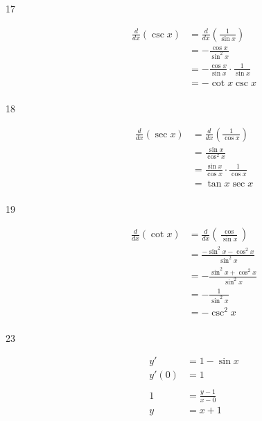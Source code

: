 \documentclass[letterpaper]{exam}
\begin{document}
\begin{description}
    \item[17] 
      \begin{align*}
          \frac{d}{dx} (\csc x) & = \frac{d}{dx} \left( \frac{1}{\sin x} \right) \\
                                & = - \frac{\cos x}{\sin^2 x} \\
                                & = - \frac{\cos x}{\sin x} \cdot \frac{1}{\sin x} \\
                                & = - \cot x \csc x \\
      \end{align*}

    \item[18] 
      \begin{align*}
          \frac{d}{dx} (\sec x) & = \frac{d}{dx} \left( \frac{1}{\cos x} \right) \\
                                & = \frac{\sin x}{\cos^2 x} \\
                                & = \frac{\sin x}{\cos x} \cdot \frac{1}{\cos x} \\
                                & = \tan x \sec x \\
      \end{align*}

    \item[19] 
      \begin{align*}
          \frac{d}{dx} (\cot x) & = \frac{d}{dx} \left( \frac{\cos}{\sin x} \right) \\
                                & = \frac{- \sin^2 x - \cos^2 x}{\sin^2 x} \\
                                & = - \frac{\sin^2 x + \cos^2 x}{\sin^2 x} \\
                                & = - \frac{1}{\sin^2 x} \\
                                & = - \csc^2 x \\
      \end{align*}

    \item[23] 
      \begin{align*}
        y'    & = 1 - \sin x \\
        y'(0) & = 1 \\
        \\
        1     & = \frac{y - 1}{x - 0} \\
        y     & = x + 1 \\
      \end{align*}


\end{description}
\end{document}
